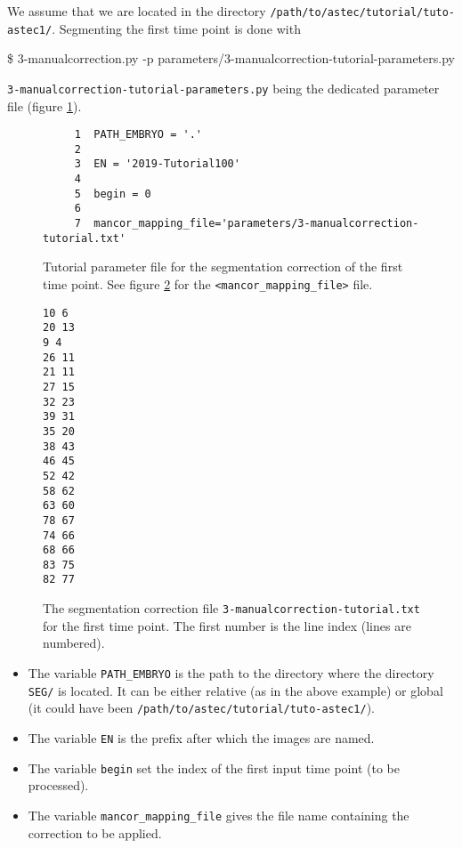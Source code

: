 We assume that we are located in the directory
\texttt{/path/to/astec/tutorial/tuto-astec1/}. Segmenting the first
time point is
done with
\begin{code}{0.8}
  \$ 3-manualcorrection.py -p parameters/3-manualcorrection-tutorial-parameters.py 
\end{code}
\texttt{3-manualcorrection-tutorial-parameters.py} being the
dedicated parameter file  (figure \ref{fig:tutorial:parameter:manual:correction}).

\begin{figure}
\begin{framed}
\begin{verbatim}
     1	PATH_EMBRYO = '.'
     2	
     3	EN = '2019-Tutorial100'
     4	
     5	begin = 0
     6	
     7	mancor_mapping_file='parameters/3-manualcorrection-tutorial.txt'
\end{verbatim}
\end{framed}
\caption{\label{fig:tutorial:parameter:manual:correction} Tutorial
  parameter file for the segmentation correction of the first time
  point. See figure
  \protect\ref{fig:tutorial:parameter:manual:correction:file} for the
  \texttt{<mancor\_mapping\_file>} file.}
\end{figure}

\begin{figure}
\begin{framed}
\begin{verbatim}
10 6
20 13
9 4
26 11
21 11
27 15
32 23
39 31
35 20
38 43
46 45
52 42
58 62
63 60
78 67
74 66
68 66
83 75
82 77
\end{verbatim}
\end{framed}
\caption{\label{fig:tutorial:parameter:manual:correction:file}
  The segmentation correction file
  \texttt{3-manualcorrection-tutorial.txt} for the first time point. The first
  number is the line index (lines are numbered).}
\end{figure}

\begin{itemize}
  \itemsep -1ex
  \item The variable \texttt{PATH\_EMBRYO} is the path to the directory where
    the directory \texttt{SEG/} is located. It can be either relative (as in the
    above example) or
    global (it could have been \texttt{/path/to/astec/tutorial/tuto-astec1/}).
  \item The variable \texttt{EN} is the prefix after which the  images
    are named. 
  \item The variable \texttt{begin} set  the
    index of the first input time point (to be processed).
  \item The variable \texttt{mancor\_mapping\_file} gives the file
    name containing the correction to be applied.
\end{itemize}

